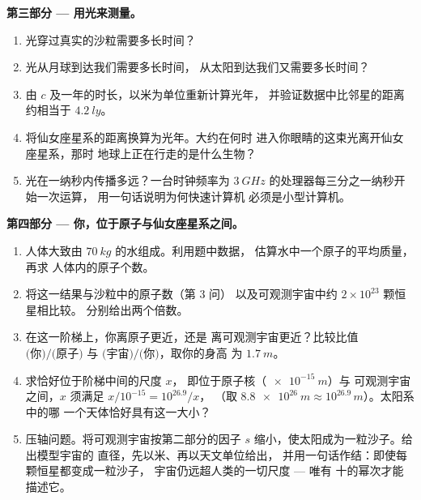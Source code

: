 \begin{problem}
\medskip
\noindent\textbf{第三部分 --- 用光来测量。}
\begin{enumerate}[resume]
  \item 光穿过真实的沙粒需要多长时间？
  \item 光从月球到达我们需要多长时间，
        从太阳到达我们又需要多长时间？
  \item 由 $c$ 及一年的时长，以米为单位重新计算光年，
        并验证数据中比邻星的距离
        约相当于 $\qty{4.2}{ly}$。
  \item 将仙女座星系的距离换算为光年。大约在何时
        进入你眼睛的这束光离开仙女座星系，那时
        地球上正在行走的是什么生物？
  \item 光在一纳秒内传播多远？一台时钟频率为
        $\qty{3}{GHz}$ 的处理器每三分之一纳秒开始一次运算，
        用一句话说明为何快速计算机
        必须是小型计算机。
\end{enumerate}

\medskip
\noindent\textbf{第四部分 --- 你，位于原子与仙女座星系之间。}
\begin{enumerate}[resume]
  \item 人体大致由 $\qty{70}{kg}$ 的水组成。利用题中数据，
        估算水中一个原子的平均质量，再求
        人体内的原子个数。
  \item 将这一结果与沙粒中的原子数（第 3 问）
        以及可观测宇宙中约 $2\times10^{23}$ 颗恒星相比较。
        分别给出两个倍数。
  \item 在这一阶梯上，你离原子更近，还是
        离可观测宇宙更近？比较比值 $\text{(你)}/\text{(原子)}$ 与
        $\text{(宇宙)}/\text{(你)}$，取你的身高
        为 $\qty{1.7}{m}$。
  \item 求恰好位于阶梯中间的尺度 $x$，
        即位于原子核（$\qty{e-15}{m}$）与
        可观测宇宙之间，$x$ 须满足 $x / 10^{-15} = 10^{26.9} / x$，
        （取 $\qty{8.8e26}{m} \approx 10^{26.9}\,\unit{m}$）。太阳系中的哪
        一个天体恰好具有这一大小？
  \item 压轴问题。将可观测宇宙按第二部分的因子
        $s$ 缩小，使太阳成为一粒沙子。给出模型宇宙的
        直径，先以米、再以天文单位给出，
        并用一句话作结：即使每颗恒星都变成一粒沙子，
        宇宙仍远超人类的一切尺度 --- 唯有
        十的幂次才能描述它。
\end{enumerate}
\end{problem}
